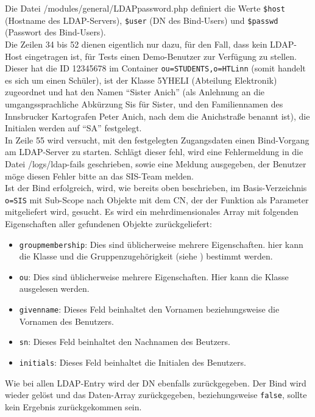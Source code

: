 
Die Datei /modules/general/LDAPpassword.php definiert die Werte \texttt{\$host} (Hostname des LDAP-Servers), \texttt{\$user} (DN des Bind-Users) und  \texttt{\$passwd} (Passwort des Bind-Users).\\
Die Zeilen 34 bis 52 dienen eigentlich nur dazu, für den Fall, dass kein LDAP-Host eingetragen ist, für Tests einen Demo-Benutzer zur Verfügung zu stellen. Dieser hat die ID 12345678 im Container \texttt{ou=STUDENTS,o=HTLinn} (somit handelt es sich um einen Schüler), ist der Klasse 5YHELI (Abteilung Elektronik) zugeordnet und hat den Namen \enquote{Sister Anich} (als Anlehnung an die umgangssprachliche Abkürzung Sis für Sister, und den Familiennamen des Innsbrucker Kartografen Peter Anich, nach dem die Anichstraße benannt ist), die Initialen werden auf \enquote{SA} festgelegt.\\
In Zeile 55 wird versucht, mit den festgelegten Zugangsdaten einen Bind-Vorgang am LDAP-Server zu starten. Schlägt dieser fehl, wird eine Fehlermeldung in die Datei /logs/ldap-fails geschrieben, sowie eine Meldung ausgegeben, der Benutzer möge diesen Fehler bitte an das SIS-Team melden.\\
Ist der Bind erfolgreich, wird, wie bereits oben beschrieben, im Basis-Verzeichnis \texttt{o=SIS} mit Sub-Scope nach Objekte mit dem CN, der der Funktion als Parameter mitgeliefert wird, gesucht. Es wird ein mehrdimensionales Array mit folgenden Eigenschaften aller gefundenen Objekte zurückgeliefert: 
\begin{itemize}
	\item \texttt{groupmembership}: Dies sind üblicherweise mehrere Eigenschaften. hier kann die Klasse und die Gruppenzugehörigkeit (siehe ) bestimmt werden.
	\item \texttt{ou}: Dies sind üblicherweise mehrere Eigenschaften. Hier kann die Klasse ausgelesen werden.
	\item \texttt{givenname}: Dieses Feld beinhaltet den Vornamen beziehungsweise die Vornamen des Benutzers.
	\item \texttt{sn}: Dieses Feld beinhaltet den Nachnamen des Beutzers.
	\item \texttt{initials}: Dieses Feld beinhaltet die Initialen des Benutzers.
\end{itemize}
Wie bei allen LDAP-Entry wird der DN ebenfalls zurückgegeben.
Der Bind wird wieder gelöst und das Daten-Array zurückgegeben, beziehungsweise \texttt{false}, sollte kein Ergebnis zurückgekommen sein.\\

